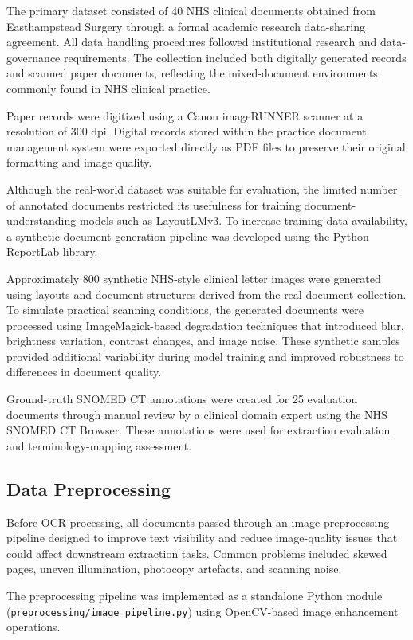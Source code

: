 The primary dataset consisted of 40 NHS clinical documents obtained from Easthampstead Surgery through a formal academic research data-sharing agreement. All data handling procedures followed institutional research and data-governance requirements. The collection included both digitally generated records and scanned paper documents, reflecting the mixed-document environments commonly found in NHS clinical practice.

Paper records were digitized using a Canon imageRUNNER scanner at a resolution of 300 dpi. Digital records stored within the practice document management system were exported directly as PDF files to preserve their original formatting and image quality.

Although the real-world dataset was suitable for evaluation, the limited number of annotated documents restricted its usefulness for training document-understanding models such as LayoutLMv3. To increase training data availability, a synthetic document generation pipeline was developed using the Python ReportLab library.

Approximately 800 synthetic NHS-style clinical letter images were generated using layouts and document structures derived from the real document collection. To simulate practical scanning conditions, the generated documents were processed using ImageMagick-based degradation techniques that introduced blur, brightness variation, contrast changes, and image noise. These synthetic samples provided additional variability during model training and improved robustness to differences in document quality.

Ground-truth SNOMED CT annotations were created for 25 evaluation documents through manual review by a clinical domain expert using the NHS SNOMED CT Browser. These annotations were used for extraction evaluation and terminology-mapping assessment.

\subsection{Data Preprocessing}

Before OCR processing, all documents passed through an image-preprocessing pipeline designed to improve text visibility and reduce image-quality issues that could affect downstream extraction tasks. Common problems included skewed pages, uneven illumination, photocopy artefacts, and scanning noise.

The preprocessing pipeline was implemented as a standalone Python module (\texttt{preprocessing/image\_pipeline.py}) using OpenCV-based image enhancement operations.


